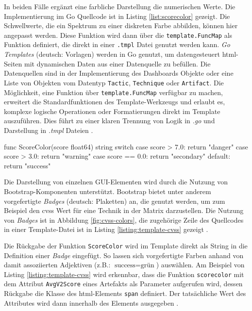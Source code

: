 \par In beiden Fälle ergänzt eine farbliche Darstellung die numerischen Werte. Die Implementierung im Go Quellcode ist in Listing \ref{list:scorecolor} gezeigt. Die Schwellwerte, die ein Spektrum zu einer diskreten Farbe abbilden, können hier angepasst werden. Diese Funktion wird dann über die \verb|template.FuncMap| als Funktion definiert, die direkt in einer \verb|.tmpl| Datei genutzt werden kann. \textit{Go Templates} (deutsch: Vorlagen) werden in Go genutzt, um datengesteuert \gls{html}-Seiten mit dynamischen Daten aus einer Datenquelle zu befüllen. Die Datenquellen sind in der Implementierung des Dashboards Objekte oder eine Liste von Objekten vom Datentyp \verb|Tactic|, \verb|Technique| oder \verb|Artifact|. Die Möglichkeit, eine Funktion über \verb|template.FuncMap| verfügbar zu machen, erweitert die Standardfunktionen des Template-Werkzeugs und erlaubt es, komplexe logische Operationen oder Formatierungen direkt im Template auszuführen. Dies führt zu einer klaren Trennung von Logik in \textit{.go} und Darstellung in \textit{.tmpl} Dateien \autocite{TemplatePackageText}.

\begin{code}[caption={Implementierung der farblichen Kategorisierung von Schweregraden}, label={list:scorecolor}]
    func ScoreColor(score float64) string {
            switch {
                    case score > 7.0:
                    return "danger"
                    case score > 3.0:
                    return "warning"
                    case score == 0.0:
                    return "secondary"
                    default:
                    return "success"
                }
        }
\end{code}

Die Darstellung von einzelnen GUI-Elementen wird durch die Nutzung von Bootstrap-Komponenten unterstützt. Bootstrap bietet unter anderem vorgefertigte \textit{Badges} (deutsch: Plaketten) an, die genutzt werden, um zum Beispiel den \gls{cvss} Wert für eine Technik in der Matrix darzustellen. Die Nutzung von \textit{Badges} ist in Abbildung \ref{fig:cvss-colors}, die zugehörige Zeile des Quellcodes in einer Template-Datei ist in Listing \ref{listing:template-cvss} gezeigt \autocite{contributorsmarkottojacobthorntonandbootstrapBadges}.

Die Rückgabe der Funktion \verb|ScoreColor| wird im Template direkt als String in die Definition einer \textit{Badge} eingefügt. So lassen sich vorgefertigte Farben anhand von damit assoziierten Adjektiven (z.B.: \(\text{success} = \text{grün}\)) auswählen. Am Beispiel von Listing \ref{listing:template-cvss} wird erkennbar, dass die Funktion \verb|scorecolor| mit dem Attribut \verb|AvgV2Score| eines Artefakts als Parameter aufgerufen wird, dessen Rückgabe die Klasse des \gls{html}-Elements \verb|span| definiert. Der tatsächliche Wert des Attributes wird dann innerhalb des Elements ausgegeben \autocite{HTMLSpanTag}.


